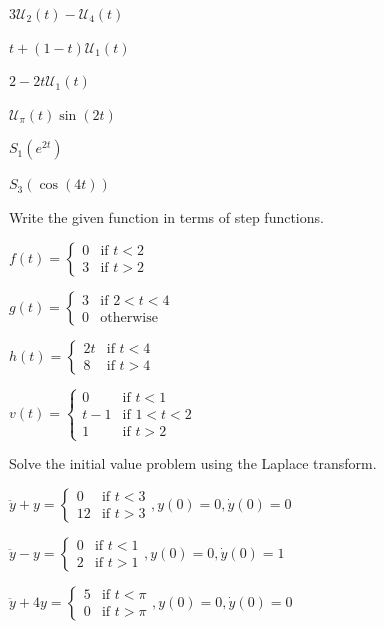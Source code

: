 {{{{\begin{multicols}{2}
\smallskip
\ap $3\mathcal{U}_2(t) - \mathcal{U}_4(t)$

\ap $t + (1-t)\mathcal{U}_1(t)$

\ap $2 - 2t \mathcal{U}_1(t)$

\ap $\mathcal{U}_\pi(t) \sin(2t)$

\ap $S_1 \left( e^{2t} \right)$

\ap $S_3 \left( \cos(4t) \right)$


\begin{instructions} Write the given function in terms of step functions.
\end{instructions}

\smallskip
\ap $f(t) = \begin{cases} 0 & \mbox{if } t < 2 \\ 3 & \mbox{if } t > 2 \end{cases}$

\ap $g(t) = \begin{cases} 3 & \mbox{if } 2 < t < 4 \\ 0 & \mbox{otherwise} \end{cases}$

\ap $h(t) = \begin{cases} 2t & \mbox{if } t < 4 \\ 8 & \mbox{if } t > 4 \end{cases}$

\ap $v(t) = \begin{cases} 0 & \mbox{if } t < 1 \\ t-1 & \mbox{if } 1 < t < 2 \\ 1 & \mbox{if } t > 2 \end{cases}$

\begin{instructions} Solve the initial value problem using the Laplace transform.
\end{instructions}

\smallskip
\ap $\ddot{y}+y = \begin{cases} 0 & \mbox{if } t < 3 \\ 12 & \mbox{if } t >  3\end{cases}, y(0)=0, \dot{y}(0)=0$

\ap $\ddot{y}-y = \begin{cases} 0 & \mbox{if } t < 1 \\ 2 & \mbox{if } t > 1 \end{cases}, y(0)=0,  \dot{y}(0)=1$

\ap $\ddot{y} + 4y = \begin{cases} 5 & \mbox{if } t < \pi \\ 0 & \mbox{if } t > \pi \end{cases}, y(0)=0, \dot{y}(0)=0$


\end{multicols}}}}}
